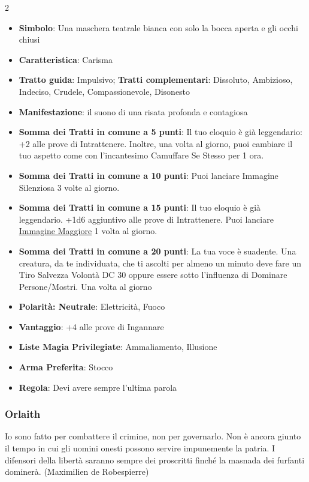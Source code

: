 \begin{multicols}{2}
\begin{itemize}[leftmargin=*] \setlength{\itemsep}{0pt}
\item \textbf{Simbolo}: Una maschera teatrale bianca con solo la bocca aperta e gli occhi chiusi
\item \textbf{Caratteristica}: Carisma
\item \textbf{Tratto guida}: Impulsivo; \textbf{Tratti complementari}: Dissoluto, Ambizioso, Indeciso, Crudele, Compassionevole, Disonesto
\item \textbf{Manifestazione}: il suono di una risata profonda e contagiosa
\item \textbf{Somma dei Tratti in comune a 5 punti}: Il tuo eloquio è già leggendario: +2 alle prove di Intrattenere. Inoltre, una volta al giorno, puoi cambiare il tuo aspetto come con l'incantesimo Camuffare Se Stesso per 1 ora.
\item \textbf{Somma dei Tratti in comune a 10 punti}: Puoi lanciare Immagine Silenziosa 3 volte al giorno.
\item \textbf{Somma dei Tratti in comune a 15 punti}: Il tuo eloquio è già leggendario. +1d6 aggiuntivo alle prove di Intrattenere. Puoi lanciare \hyperlink{Immagine Maggiore}{Immagine Maggiore} 1 volta al giorno.
\item \textbf{Somma dei Tratti in comune a 20 punti}: La tua voce è suadente. Una creatura, da te individuata, che ti ascolti per almeno un minuto deve fare un Tiro Salvezza Volontà DC 30 oppure essere sotto l'influenza di Dominare Persone/Mostri. Una volta al giorno
\item \textbf{Polarità: Neutrale}: Elettricità, Fuoco
\item \textbf{Vantaggio}: +4 alle prove di Ingannare
\item \textbf{Liste Magia Privilegiate}: Ammaliamento, Illusione
\item \textbf{Arma Preferita}: Stocco
\item \textbf{Regola}: Devi avere sempre l'ultima parola
\end{itemize}

\subsubsection{Orlaith}\label{orlaith}\hypertarget{orlaith}{}

\begin{enfasi}{
Io sono fatto per combattere il crimine, non per governarlo. Non è ancora giunto il tempo in cui gli uomini onesti possono servire impunemente la patria. I difensori della libertà saranno sempre dei proscritti finché la masnada dei furfanti dominerà. (Maximilien de Robespierre)
}\end{enfasi}


\end{multicols}
